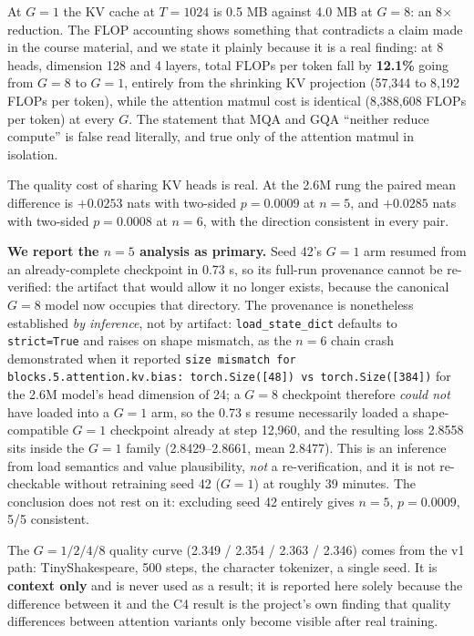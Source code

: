\documentclass[11pt,a4paper]{article}
\begin{document}
At $G = 1$ the KV cache at $T = 1024$ is 0.5 MB against 4.0 MB at $G = 8$: an
8$\times$ reduction. %
 The FLOP accounting shows something that contradicts a
claim made in the course material, and we state it plainly because it is a real
finding: at 8 heads, dimension 128 and 4 layers, total FLOPs per token fall by
\textbf{12.1\%} going from $G = 8$ to $G = 1$, entirely from the shrinking KV
projection (57,344 to 8,192 FLOPs per token), while the attention matmul cost
is identical (8,388,608 FLOPs per token) at every $G$. The statement that MQA
and GQA ``neither reduce compute'' is false read literally, and true only of the
attention matmul in isolation. %


The quality cost of sharing KV heads is real. At the 2.6M rung the paired mean
difference is $+0.0253$ nats with two-sided $p = 0.0009$ at $n = 5$, and
$+0.0285$ nats with two-sided $p = 0.0008$ at $n = 6$, with the direction
consistent in every pair. %


\textbf{We report the $n = 5$ analysis as primary.} Seed 42's $G = 1$ arm
resumed from an already-complete checkpoint in 0.73 s, so its full-run
provenance cannot be re-verified: the artifact that would allow it no longer
exists, because the canonical $G = 8$ model now occupies that directory. The
provenance is nonetheless established \emph{by inference}, not by artifact:
\texttt{load\_state\_dict} defaults to \texttt{strict=True} and raises on shape
mismatch, as the $n = 6$ chain crash demonstrated when it reported
\texttt{size mismatch for blocks.5.attention.kv.bias: torch.Size([48]) vs
torch.Size([384])} for the 2.6M model's head dimension of 24; a $G = 8$
checkpoint therefore \emph{could not} have loaded into a $G = 1$ arm, so the
0.73 s resume necessarily loaded a shape-compatible $G = 1$ checkpoint already
at step 12,960, and the resulting loss 2.8558 sits inside the $G = 1$ family
(2.8429--2.8661, mean 2.8477). This is an inference from load semantics and
value plausibility, \emph{not} a re-verification, and it is not re-checkable
without retraining seed 42 ($G = 1$) at roughly 39 minutes. The conclusion does
not rest on it: excluding seed 42 entirely gives $n = 5$, $p = 0.0009$, 5/5
consistent.

The $G = 1/2/4/8$ quality curve (2.349 / 2.354 / 2.363 / 2.346) comes from the
v1 path: TinyShakespeare, 500 steps, the character tokenizer, a single seed. It
is \textbf{context only} and is never used as a result; it is reported here
solely because the difference between it and the C4 result is the project's
own finding that quality differences between attention variants only become
visible after real training. %
\end{document}
